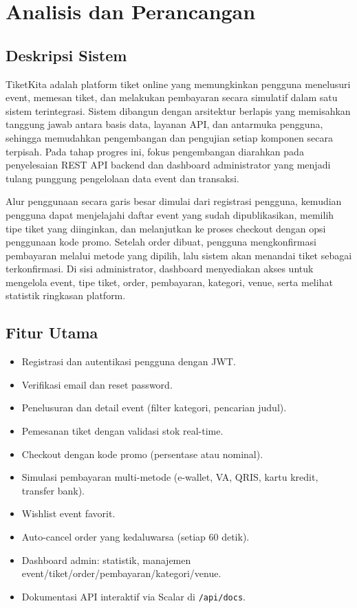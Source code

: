 \documentclass[12pt,a4paper]{report}
\begin{document}
\chapter{Analisis dan Perancangan}

\section{Deskripsi Sistem}
TiketKita adalah platform tiket online yang memungkinkan pengguna menelusuri event, memesan tiket, dan melakukan pembayaran secara simulatif dalam satu sistem terintegrasi. Sistem dibangun dengan arsitektur berlapis yang memisahkan tanggung jawab antara basis data, layanan API, dan antarmuka pengguna, sehingga memudahkan pengembangan dan pengujian setiap komponen secara terpisah. Pada tahap progres ini, fokus pengembangan diarahkan pada penyelesaian REST API backend dan dashboard administrator yang menjadi tulang punggung pengelolaan data event dan transaksi.

Alur penggunaan secara garis besar dimulai dari registrasi pengguna, kemudian pengguna dapat menjelajahi daftar event yang sudah dipublikasikan, memilih tipe tiket yang diinginkan, dan melanjutkan ke proses checkout dengan opsi penggunaan kode promo. Setelah order dibuat, pengguna mengkonfirmasi pembayaran melalui metode yang dipilih, lalu sistem akan menandai tiket sebagai terkonfirmasi. Di sisi administrator, dashboard menyediakan akses untuk mengelola event, tipe tiket, order, pembayaran, kategori, venue, serta melihat statistik ringkasan platform.

\section{Fitur Utama}
\begin{itemize}
    \item Registrasi dan autentikasi pengguna dengan JWT.
    \item Verifikasi email dan reset password.
    \item Penelusuran dan detail event (filter kategori, pencarian judul).
    \item Pemesanan tiket dengan validasi stok real-time.
    \item Checkout dengan kode promo (persentase atau nominal).
    \item Simulasi pembayaran multi-metode (e-wallet, VA, QRIS, kartu kredit, transfer bank).
    \item Wishlist event favorit.
    \item Auto-cancel order yang kedaluwarsa (setiap 60 detik).
    \item Dashboard admin: statistik, manajemen event/tiket/order/pembayaran/kategori/venue.
    \item Dokumentasi API interaktif via Scalar di \texttt{/api/docs}.
\end{itemize}
\end{document}
